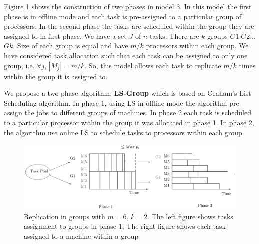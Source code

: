 \documentclass[10pt, conference, compsocconf]{IEEEtran}
\begin{document}
Figure \ref{fig:Model 3} shows the construction of two phases in model
3.  In this model the first phase is in offline mode and each task is
pre-assigned to a particular group of processors. In the second phase
the tasks are scheduled within the group they are assigned to in first
phase.  We have a set $J$ of $ n$ tasks.  There are $k$ groups
$G1$,$G2$...$Gk$.  Size of each group is equal and have $m/k$
processors within each group.  We have considered task allocation such
that each task can be assigned to only one group, i.e. $\forall j$,
$|M_j|= m/k$. So, this model allows each task to replicate $ m/k $
times within the group it is assigned to.

We propose a two-phase algorithm, \textbf{LS-Group} which is based on
Graham's List Scheduling algorithm. In phase 1, using LS in offline
mode the algorithm pre-assign the jobs to different groups of
machines. In phase 2 each task is scheduled to a particular processor
within the group it was allocated in phase 1. In phase 2, the
algorithm use online LS to schedule tasks to processors within each
group.

\begin{figure}[htp] 
\centering
\includegraphics[width= 16 cm]{model3.pdf}
\caption{Replication in groups with $m = 6$, $k = 2$. The left figure
  shows tasks assignment to groups in phase 1; The right figure shows
  each task assigned to a machine within a group}
\label{fig:Model 3}
\end{figure}
\end{document}

